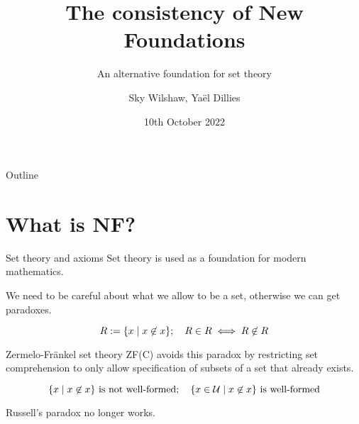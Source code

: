 \documentclass[xcolor=dvipsnames]{beamer}
\title{The consistency of New Foundations}
\subtitle{An alternative foundation for set theory}
\author{Sky Wilshaw, Ya\"el Dillies}
\institute{University of Cambridge}
\date{10th October 2022}
\begin{document}
\begin{frame}
    \titlepage
\end{frame}

\begin{frame}{Outline}
    \tableofcontents[hideallsubsections]
\end{frame}

\section{What is NF?}

\begin{frame}{Set theory and axioms}
    Set theory is used as a foundation for modern mathematics.

    \medskip

    We need to be careful about what we allow to be a set, otherwise we can get paradoxes.

    \[ R := \qty{x\mid x\not\in x};\quad R \in R \iff R \not\in R \]
\end{frame}
\begin{frame}{Zermelo-Fr\"ankel set theory}
    ZF(C) avoids this paradox by restricting set comprehension to only allow specification of subsets of a set that already exists.

    \[ \qty{x\mid x \not\in x} \text{ is not well-formed};\quad \qty{x\in \mathcal U\mid x \not\in x} \text{ is well-formed} \]

    Russell's paradox no longer works.
\end{frame}
\end{document}
